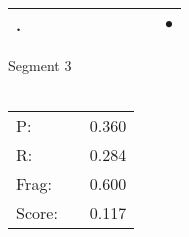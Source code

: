 \documentclass[landscape]{article}
\newcommand{\ssp}{\hspace{2pt}}
\newcommand{\mex}{\cellcolor{g}$\bullet$}
\begin{document}
\begin{tabular}{|l|p{10pt}|p{10pt}|p{10pt}|p{10pt}|p{10pt}|p{10pt}|p{10pt}|p{10pt}|p{10pt}|}
\hline
\ssp \cellcolor{ref8}. \ssp&\hspace{2pt}&\hspace{2pt}&\hspace{2pt}&\hspace{2pt}&\hspace{2pt}&\hspace{2pt}&\hspace{2pt}&\hspace{2pt}&\hspace{2pt}\mex\\
\hline
\end{tabular}

\vspace{6pt}
\noindent Segment 3\\\\
\noindent\begin{tabular}{lm{12pt}r}
\hline
P:&&0.360\\
R:&&0.284\\
Frag:&&0.600\\
Score:&&0.117\\
\end{tabular}

\newpage
\end{document}
